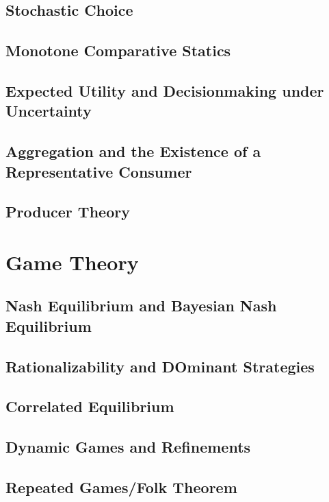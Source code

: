 \documentclass[12pt,openany]{report}
\theoremstyle{definition}
\begin{document}
\chapter{Stochastic Choice}

\chapter{Monotone Comparative Statics}

\chapter{Expected Utility and Decisionmaking under Uncertainty}

\chapter{Aggregation and the Existence of a Representative Consumer}

\chapter{Producer Theory}

\part{Game Theory}

\chapter{Nash Equilibrium and Bayesian Nash Equilibrium}

\chapter{Rationalizability and DOminant Strategies}

\chapter{Correlated Equilibrium}

\chapter{Dynamic Games and Refinements}

\chapter{Repeated Games/Folk Theorem}
\end{document}
